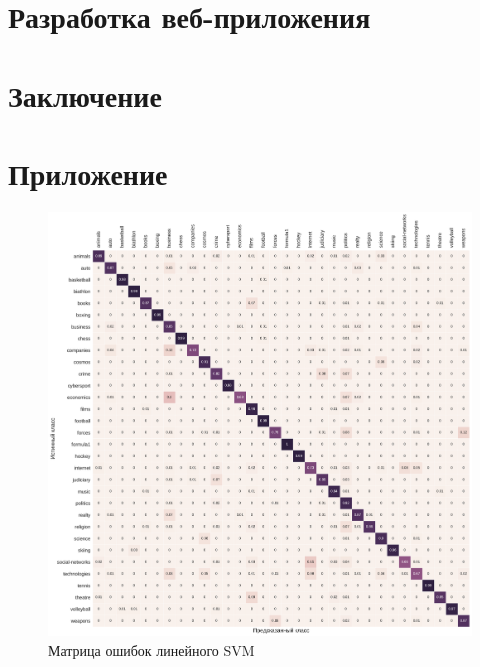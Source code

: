 \documentclass[a4paper, 14pt]{extarticle}
\begin{document}
\section{Разработка веб-приложения}


\section{Заключение}


\setcounter{secnumdepth}{0}
\section{Приложение}
\begin{figure}[h!]
	\centering
	\includegraphics[width=1\textwidth]{svm_confusion_matrix.pdf}
	\caption{Матрица ошибок линейного SVM}
	\label{svm_confusion}
\end{figure}
\end{document}
